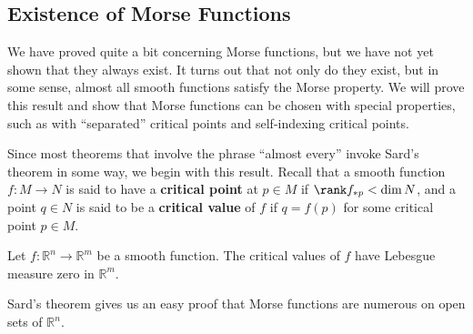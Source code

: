 \subsection{Existence of Morse Functions}
\label{Existence of Morse functions}

We have proved quite a bit concerning Morse functions, but we have not yet shown that they always exist. It turns out that not only do they exist, but in some sense, almost all smooth functions satisfy the Morse property. We will prove this result and show that Morse functions can be chosen with special properties, such as with ``separated'' critical points and self-indexing critical points.

Since most theorems that involve the phrase ``almost every'' invoke Sard's theorem in some way, we begin with this result. Recall that a smooth function $f : M \rightarrow N$ is said to have a \textbf{critical point} at $p \in M$ if $\rank f_{*p} < \dim N$, and a point $q \in N$ is said to be a \textbf{critical value} of $f$ if $q=f(p)$ for some critical point $p \in M$.

\begin{thm}
\label{Sard's Theorem}
Let $f : \mathbb R^n \rightarrow \mathbb R^m$ be a smooth function. The critical values of $f$ have Lebesgue measure zero in $\mathbb R^m$.
\end{thm}

Sard's theorem gives us an easy proof that Morse functions are numerous on open sets of $\mathbb R^n$.

